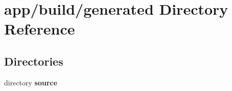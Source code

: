 \section{app/build/generated Directory Reference}
\label{dir_b3e41f061aadad8a64d9fd941d754735}
\subsection*{Directories}
\begin{DoxyCompactItemize}
\item 
directory {\bf source}
\end{DoxyCompactItemize}
